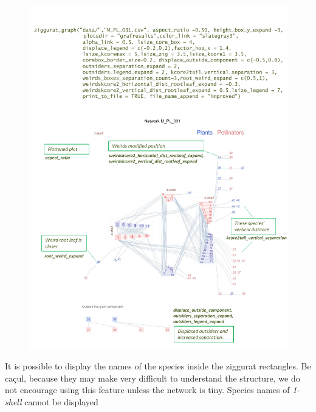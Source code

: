 \documentclass[12pt]{article}
\begin{document}
\clearpage
\begin{figure}[hp!]
\centering
\includegraphics[scale=0.8]{M_PL_031_ziggurat_improved.pdf}
\label{fig:KMAN_ziggurat_031_improved}
\end{figure}


\clearpage

It is possible to display the names of the species inside the ziggurat rectangles. Be caçul, because they may make
very difficult to understand the structure, we do not encourage using this feature unless the network is tiny. Species
names of \textit{1-shell} cannot be displayed
\end{document}

